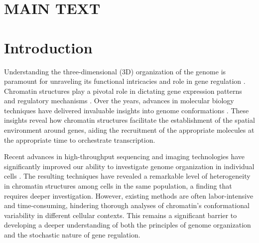\documentclass[12pt,letterpaper]{article}
\begin{document}
\section*{MAIN TEXT}
\mbox{}
\section*{Introduction}


Understanding the three-dimensional (3D) organization of the genome is paramount for unraveling its functional intricacies and role in gene regulation \cite{Dekker2017,liu2024Nucleosomes}. 
Chromatin structures play a pivotal role in dictating gene expression patterns and regulatory mechanisms \cite{Dekker2016a,Gor14,Furlong2018}. 
Over the years, advances in molecular biology techniques have delivered invaluable insights into genome conformations \cite{Lie09,Tan2018,Bintu2018,Takei2021}. These insights reveal how chromatin structures facilitate the establishment of the spatial environment around genes, aiding the recruitment of the appropriate molecules at the appropriate time to orchestrate transcription. 



Recent advances in high-throughput sequencing and imaging technologies have significantly improved our ability to investigate genome organization in individual cells \cite{Nag17,Ste17,Tan2018,Bintu2018,Takei2021}. 
The resulting techniques have revealed a remarkable level of heterogeneity in chromatin structures among cells in the same population, a finding that requires deeper investigation. However, existing methods are often labor-intensive and time-consuming, %
hindering thorough analyses of chromatin's conformational variability in different cellular contexts.
This remains a significant barrier to developing a deeper understanding of both the principles of genome organization and the stochastic nature of gene regulation.  
\end{document}
